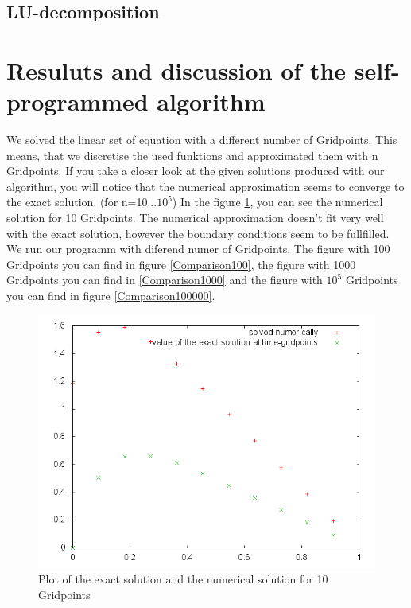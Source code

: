 \documentclass[10pt,a4paper]{article}
\begin{document}
\subsection{LU-decomposition}

\section{Resuluts and discussion of the self-programmed algorithm}

We solved the linear set of equation with a different number of Gridpoints. This means, that we discretise the used funktions and approximated them with n Gridpoints. If you take a closer look at the given solutions produced with our algorithm, you will notice that the numerical approximation seems to converge to the exact solution. (for n=10...$10^5$) In the figure \ref{Comparison10}, you can see the numerical solution for 10 Gridpoints. The numerical approximation doesn't fit very well with the exact solution, however the boundary conditions seem to be fullfilled. We run our programm with diferend numer of Gridpoints. The figure with 100 Gridpoints you can find in figure \ref{Comparison100}, the figure with 1000 Gridpoints you can find in \ref{Comparison1000} and the figure with $10^5$ Gridpoints you can find in figure \ref{Comparison100000}. 


\begin{figure}[h]
\centering
\includegraphics[scale=0.5]{Comparisonplot10.png}
\caption{Plot of the exact solution and the numerical solution for 10 Gridpoints}
\label{Comparison10}
\end{figure}
\end{document}
